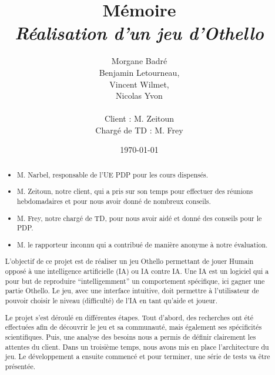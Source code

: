 \documentclass[a4paper,12pt]{report}
\newenvironment*{remerciements}{%
\renewcommand*{\abstractname}{Remerciements}
\begin{abstract}
}{\end{abstract}}
\begin{document}
\title{Mémoire\\
  \textit{Réalisation d'un jeu d'Othello}
  }

\author{Morgane Badré\\
  Benjamin Letourneau,\\
  Vincent Wilmet,\\
  Nicolas Yvon\\ \\
  Client : M. Zeitoun \\
  Chargé de TD : M. Frey}
\date\today

\maketitle


\begin{remerciements}
\begin{itemize}
  \item M. Narbel, responsable de l’UE PDP pour les cours dispensés.
  \item M. Zeitoun, notre client, qui a pris sur son temps pour effectuer des réunions hebdomadaires et pour nous avoir donné de nombreux conseils.
  \item M. Frey, notre chargé de TD, pour nous avoir aidé et donné des conseils pour le PDP.
  \item M. le rapporteur inconnu qui a contribué de manière anonyme à notre évaluation.
\end{itemize}
\end{remerciements}


\begin{abstract}

L’objectif de ce projet est de réaliser un jeu Othello permettant de jouer Humain opposé à une intelligence artificielle (IA) ou IA contre IA. Une IA est un logiciel qui a pour but de reproduire “intelligemment” un comportement spécifique, ici gagner une partie Othello. Le jeu, avec une interface intuitive, doit permettre à l’utilisateur de pouvoir choisir le niveau (difficulté) de  l’IA en tant qu’aide et joueur.

Le projet s’est déroulé en différentes étapes. Tout d’abord, des recherches ont été effectuées afin de découvrir le jeu et sa communauté, mais également ses spécificités scientifiques. Puis, une analyse des besoins nous a permis de définir clairement les attentes du client. Dans un troisième temps, nous avons mis en place l’architecture du jeu. Le développement a ensuite commencé et pour terminer, une série de tests va être présentée.
\end{abstract}
\end{document}
